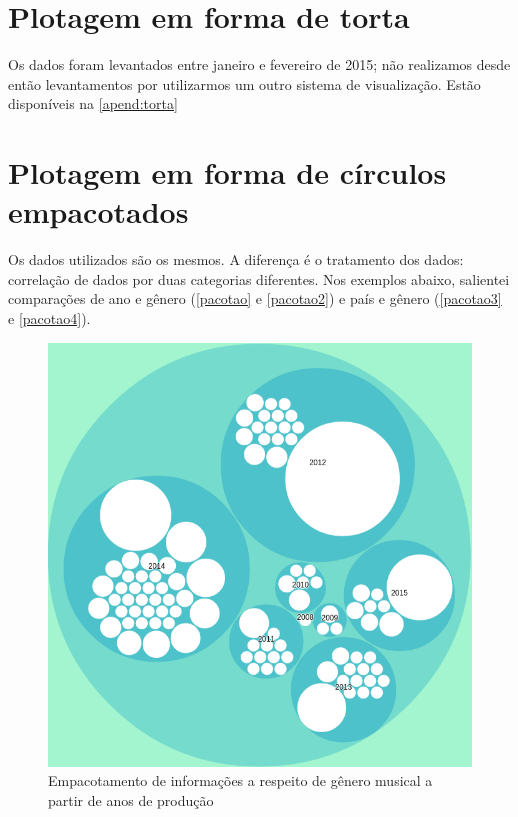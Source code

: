 \section{Plotagem em forma de torta}

Os dados foram levantados entre janeiro e fevereiro de 2015; não realizamos desde então levantamentos por utilizarmos um outro sistema de visualização. Estão disponíveis na \autoref{apend:torta}

\section{Plotagem em forma de círculos empacotados}\label{dados_pacotao}

Os dados utilizados são os mesmos. A diferença é o tratamento dos dados: correlação de dados por duas categorias diferentes. Nos exemplos abaixo, salientei comparações de ano e gênero (\autoref{pacotao} e \autoref{pacotao2}) e país e gênero (\autoref{pacotao3} e \autoref{pacotao4}).

\begin{figure}
\begin{center}
\includegraphics[scale=0.6]{./imagens/zoomable_circle_packing_genre_year_livecoding.png}
\caption{Empacotamento de informações a respeito de gênero musical a partir de anos de produção}
\label{pacotao}
\end{center}
\end{figure}

